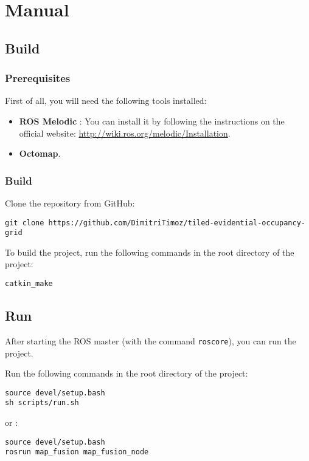 
\chapter{Manual}

\section{Build}

\subsection{Prerequisites}

First of all, you will need the following tools installed:
\begin{itemize}
    \item \textbf{ROS Melodic} : You can install it by following the instructions on the official website: \url{http://wiki.ros.org/melodic/Installation}.
    \item \textbf{Octomap}.
\end{itemize}

\subsection{Build}

Clone the repository from GitHub:
\begin{verbatim}
git clone https://github.com/DimitriTimoz/tiled-evidential-occupancy-grid
\end{verbatim}

To build the project, run the following commands in the root directory of the project:
\begin{verbatim}
catkin_make
\end{verbatim}

\section{Run}

After starting the ROS master (with the command \texttt{roscore}), you can run the project.

Run the following commands in the root directory of the project:

\begin{verbatim}
source devel/setup.bash
sh scripts/run.sh
\end{verbatim}

or :

\begin{verbatim}
source devel/setup.bash
rosrun map_fusion map_fusion_node
\end{verbatim}

